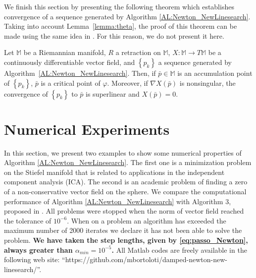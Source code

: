 %

\noindent We finish this section  by presenting the following theorem which establishes convergence of a sequence generated by Algorithm \ref{AL:Newton_NewLinesearch}. Taking into account Lemma~\ref{lemma:theta}, the proof of this theorem can be made using the same idea in \cite[Theorem 4.2]{bortoloti2022efficient}. For this reason, we do not present it here.

\begin{theorem}\label{theoremAuxiliary123}
Let $\mathbb{M}$ be a Riemannian manifold, $R$ a retraction on $\mathbb{M}$, $X:\mathbb{M} \to T\mathbb{M}$ be a continuously differentiable vector field, and $\left\{p_{k}\right\}$ a sequence generated by Algorithm~\ref{AL:Newton_NewLinesearch}. Then, if $\bar p\in \mathbb{M}$ is an accumulation point of $\left\{p_{k}\right\}$,   $\bar p$ is a critical point of $\varphi$.
Moreover,  if $\nabla X(\bar p)$ is nonsingular, the convergence of $\left\{p_{k}\right\}$ to $\bar p$ is superlinear and $X(\bar p)=0$.
\end{theorem}

\section{Numerical Experiments}\label{Sec:Numerical_Experiment}

In this section, we present two examples to show some numerical properties of Algorithm \ref{AL:Newton_NewLinesearch}. The first one is a minimization problem on the Stiefel  manifold that is related to applications in the independent component analysis (ICA).
The second is an academic problem of finding a zero of a non-conservative vector field on the sphere.
We compare the computational performance of Algorithm \ref{AL:Newton_NewLinesearch} with Algorithm 3, proposed in \cite{bortoloti2022efficient}.
All problems were stopped when the norm of vector field reached the tolerance of $10^{-6}$. When on a problem an algorithm has exceeded the maximum number of 2000 iterates we declare it has not been able to solve the problem.
{\bf We have taken the step lengths, given by \eqref{eq:passo_Newton}, always greater than  $\alpha_{min} = 10^{-5}$.}
All Matlab codes are freely available in the following web site: ``https://github.com/mbortoloti/damped-newton-new-linesearch/''.


